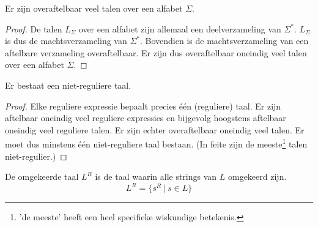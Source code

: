 \documentclass[main.tex]{subfiles}
\begin{document}
\begin{st}
  \label{st:overaftelbaar-veel-talen}
  Er zijn overaftelbaar veel talen over een alfabet $\Sigma$.

  \begin{proof}
    De talen $L_{\Sigma}$ over een alfabet zijn allemaal een deelverzameling van $\Sigma^{*}$.  $L_{\Sigma}$ is dus de machtsverzameling van $\Sigma^{*}$.
    Bovendien is de machtsverzameling van een aftelbare verzameling overaftelbaar.
    Er zijn dus overaftelbaar oneindig veel talen over een alfabet $\Sigma$.
  \end{proof}
\end{st}

\begin{st}
  Er bestaat een niet-reguliere taal.

  \begin{proof}
    Elke reguliere expressie bepaalt precies \'e\'en (reguliere) taal.
    Er zijn aftelbaar oneindig veel reguliere expressies en bijgevolg hoogstens aftelbaar oneindig veel reguliere talen.
    Er zijn echter overaftelbaar oneindig veel talen.
    Er moet dus minstens \'e\'en niet-reguliere taal bestaan.
    (In feite zijn de meeste\footnote{'de meeste' heeft een heel specifieke wiskundige betekenis.} talen niet-regulier.)
  \end{proof}
\end{st}

\begin{de}
  De omgekeerde taal $L^{R}$ is de taal waarin alle strings van $L$ omgekeerd zijn.
  \[ L^{R} = \{ s^{R}\ |\ s \in L \} \]
\end{de}
\end{document}
